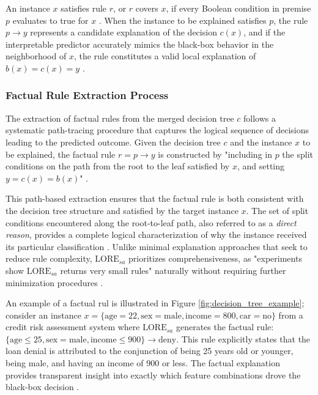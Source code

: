 An instance $x$ satisfies rule $r$, or $r$ covers $x$, if every Boolean condition in premise $p$ evaluates to true for $x$ \cite{guidotti2022stable}. When the instance to be explained satisfies $p$, the rule $p \rightarrow y$ represents a candidate explanation of the decision $c(x)$, and if the interpretable predictor accurately mimics the black-box behavior in the neighborhood of $x$, the rule constitutes a valid local explanation of $b(x) = c(x) = y$ \cite{bodria2023benchmarking}.

\subsubsection{Factual Rule Extraction Process}

The extraction of factual rules from the merged decision tree $c$ follows a systematic path-tracing procedure that captures the logical sequence of decisions leading to the predicted outcome. Given the decision tree $c$ and the instance $x$ to be explained, the factual rule $r = p \rightarrow y$ is constructed by "including in $p$ the split conditions on the path from the root to the leaf satisfied by $x$, and setting $y = c(x) = b(x)$" \cite{guidotti2022stable}.

This path-based extraction ensures that the factual rule is both consistent with the decision tree structure and satisfied by the target instance $x$. The set of split conditions encountered along the root-to-leaf path, also referred to as a \textit{direct reason}, provides a complete logical characterization of why the instance received its particular classification \cite{guidotti2022stable}. Unlike minimal explanation approaches that seek to reduce rule complexity, $\text{LORE}_{sa}$ prioritizes comprehensiveness, as "experiments show $\text{LORE}_{sa}$ returns very small rules" naturally without requiring further minimization procedures \cite{guidotti2022stable}.

An example of a factual rul is illustrated in Figure \ref{fig:decision_tree_example}; consider an instance $x=\{\text{age}=22, \text{sex}=\text{male}, \text{income}=800, \text{car}=\text{no}\}$ from a credit risk assessment system where $\text{LORE}_{sa}$ generates the factual rule: $\{\text{age} \leq 25, \text{sex} = \text{male}, \text{income} \leq 900\} \rightarrow \text{deny}$. This rule explicitly states that the loan denial is attributed to the conjunction of being 25 years old or younger, being male, and having an income of 900 or less. The factual explanation provides transparent insight into exactly which feature combinations drove the black-box decision \cite{guidotti2022stable}.


